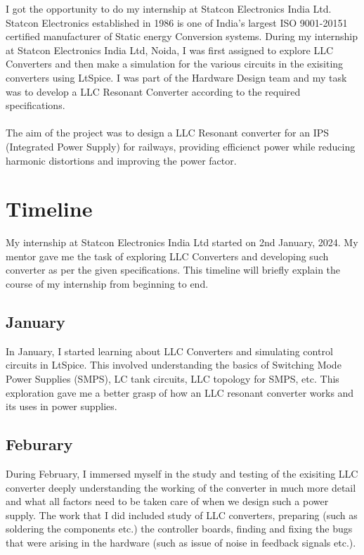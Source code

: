 I got the opportunity to do my internship at Statcon Electronics India Ltd.
Statcon Electronics established in 1986 is one of India's largest ISO
9001-20151 certified manufacturer of Static energy Conversion systems. During my
internship at Statcon Electronics India Ltd, Noida, I was first assigned to
explore LLC Converters and then make a simulation for the various circuits in the 
exisiting converters using LtSpice. I was part of the Hardware Design team and
my task was to develop a LLC Resonant Converter according to the required specifications.\\
\\
The aim of the project was to design a LLC Resonant converter for an IPS (Integrated
Power Supply) for railways, providing efficienct power while reducing
harmonic distortions and improving the power factor.

\section{Timeline}
My internship at Statcon Electronics India Ltd started on 2nd January, 2024.
My mentor gave me the task of exploring LLC Converters and developing such
converter as per the given specifications. This timeline will briefly
explain the course of my internship from beginning to end.

\subsection{January}
In January, I started learning about LLC Converters and simulating control
circuits in LtSpice. This involved understanding the basics of Switching
Mode Power Supplies (SMPS), LC tank circuits, LLC topology for SMPS, etc.
This exploration gave me a better grasp of how an LLC resonant converter
works and its uses in power supplies.

\subsection{Feburary}
During February, I immersed myself in the study and testing of the exisiting
LLC converter deeply understanding the working of the converter in much more
detail and what all factors need to be taken care of when we design such a
power supply. The work that I did included study of LLC converters, 
preparing (such as soldering the components etc.) the controller boards, 
finding and fixing the bugs that were arising in the hardware (such as
issue of noise in feedback signals etc.).

